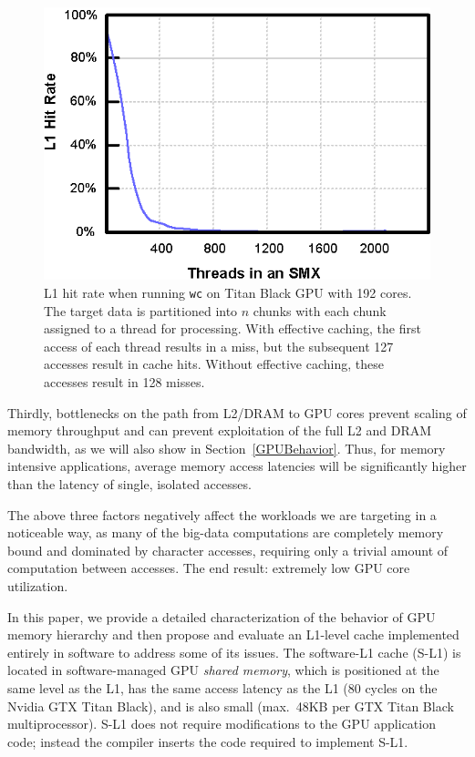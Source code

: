 \begin{figure}
\center
\includegraphics[scale=0.90]{WC-L1HitRate.eps}
\caption{\footnotesize\textnormal{L1 hit rate when running \texttt{wc} on Titan Black GPU with 192 cores. The target data is partitioned into $n$ chunks with each chunk assigned to a thread for processing. With effective caching, the first access of each thread results in a miss, but the subsequent 127 accesses result in cache hits. Without effective caching, these accesses result in 128 misses.}}
\label{fig:L1HitRate}
\end{figure}

Thirdly, bottlenecks on the path from L2/DRAM to GPU cores prevent scaling of memory throughput and can prevent exploitation of the full L2 and DRAM bandwidth, as we will also show in Section~\ref{GPUBehavior}.
Thus, for memory intensive applications, average memory access latencies will be significantly higher than the latency of single, isolated accesses.

The above three factors negatively affect the workloads we are targeting in a noticeable way,
as many of the big-data computations are completely memory bound and dominated by character accesses, requiring only a
trivial amount of computation between accesses.
The end result: extremely low GPU core utilization.

In this paper, we provide a detailed characterization of the behavior of GPU memory hierarchy and then propose and evaluate
an L1-level cache implemented entirely in software to address some of its issues. %
The software-L1 cache (S-L1) is located in software-managed GPU \emph{shared memory},
which is positioned at the same level as the L1, has the same access latency as the L1  (80 cycles on the Nvidia GTX Titan Black), and is also small (max.\ 48KB per GTX Titan Black multiprocessor).
S-L1 does not require modifications to the GPU application code; instead the compiler inserts the code required to implement S-L1.

